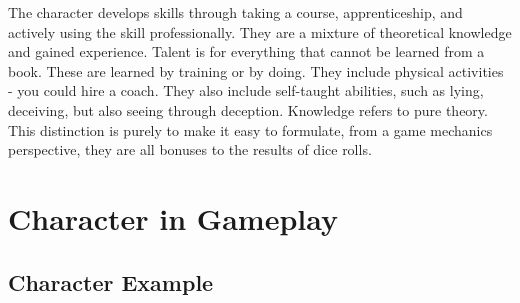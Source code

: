 \documentclass{LegrandOrangeTufteBook}
\newcommand{\term}[1]{\textcolor{colorTerm}{#1}}
\begin{document}


The character develops \term{skill}s through taking a course, apprenticeship, and actively using the skill professionally. They are a mixture of theoretical knowledge and gained experience. \term{Talent} is for everything that cannot be learned from a book. These are learned by training or by doing. They include physical activities - you could hire a coach. They also include self-taught abilities, such as lying, deceiving, but also seeing through deception. \term{Knowledge} refers to pure theory. This distinction is purely to make it easy to formulate, from a game mechanics perspective, they are all bonuses to the results of dice rolls. \\

\section*{Character in Gameplay}

\subsection*{Character Example}
\end{document}
